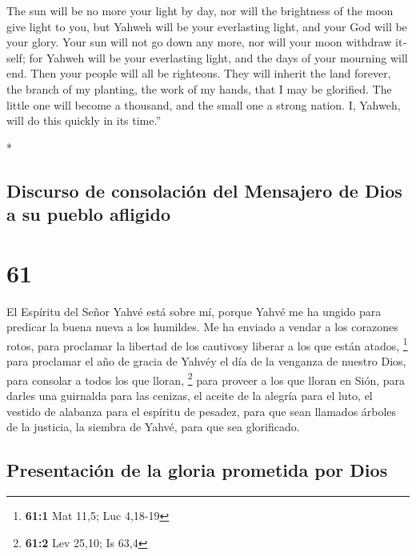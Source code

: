\begin{paracol}{2}
\begin{otherlanguage}{english}
 The sun will be no more your light by day, nor will the
brightness of the moon give light to you, but Yahweh will be your
everlasting light, and your God will be your glory.  Your
sun will not go down any more, nor will your moon withdraw itself; for
Yahweh will be your everlasting light, and the days of your mourning
will end.  Then your people will all be righteous. They
will inherit the land forever, the branch of my planting, the work of my
hands, that I may be glorified.  The little one will
become a thousand, and the small one a strong nation. I, Yahweh, will do
this quickly in its time.''

\end{otherlanguage}

\switchcolumn[0]*

\hypertarget{discurso-de-consolaciuxf3n-del-mensajero-de-dios-a-su-pueblo-afligido}{%
\subsection{Discurso de consolación del Mensajero de Dios a su pueblo
afligido}\label{discurso-de-consolaciuxf3n-del-mensajero-de-dios-a-su-pueblo-afligido}}

\hypertarget{section-120}{%
\section{61}\label{section-120}}

 El Espíritu del Señor Yahvé está sobre mí, porque Yahvé
me ha ungido para predicar la buena nueva a los humildes. Me ha enviado
a vendar a los corazones rotos, para proclamar la libertad de los
cautivosy liberar a los que están atados, \footnote{\textbf{61:1} Mat
  11,5; Luc 4,18-19}  para proclamar el año de gracia de
Yahvéy el día de la venganza de nuestro Dios, para consolar a todos los
que lloran, \footnote{\textbf{61:2} Lev 25,10; Is 63,4} 
para proveer a los que lloran en Sión, para darles una guirnalda para
las cenizas, el aceite de la alegría para el luto, el vestido de
alabanza para el espíritu de pesadez, para que sean llamados árboles de
la justicia, la siembra de Yahvé, para que sea glorificado.

\hypertarget{presentaciuxf3n-de-la-gloria-prometida-por-dios}{%
\subsection{Presentación de la gloria prometida por
Dios}\label{presentaciuxf3n-de-la-gloria-prometida-por-dios}}


\end{paracol}
